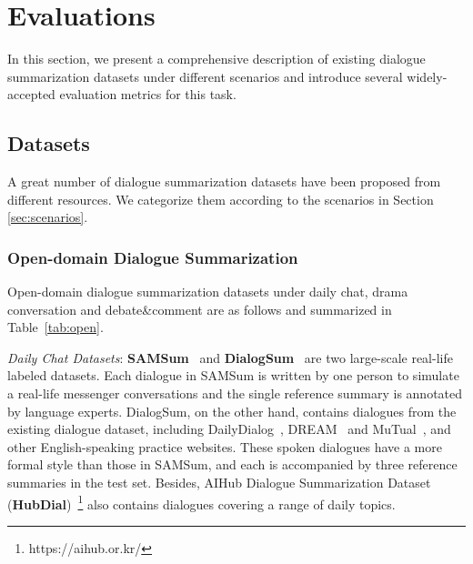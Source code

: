 \section{Evaluations}
\label{sec:evaluation}

In this section, we present a comprehensive description of existing dialogue summarization datasets 
under different scenarios and introduce several widely-accepted evaluation 
metrics for this task.

\subsection{Datasets}
\label{sec:dataset}

A great number of dialogue summarization datasets have been proposed from different resources. We categorize them according to the scenarios in Section \ref{sec:scenarios}. %


\subsubsection{Open-domain Dialogue Summarization}

Open-domain dialogue summarization datasets under daily chat, drama conversation and debate\&comment are as follows and summarized in Table~\ref{tab:open}.

\textit{Daily Chat Datasets}: \textbf{SAMSum}~\cite{gliwa2019samsum} and \textbf{DialogSum}~\cite{chen2021dialsumm} are two large-scale real-life labeled datasets. Each dialogue in SAMSum is written by one person to simulate a real-life 
messenger conversations and the single reference summary is annotated by 
language experts. DialogSum, on the other hand, contains dialogues from 
the existing dialogue dataset, including DailyDialog~\cite{li2017dailydialog}, 
DREAM~\cite{sun2019dream} and MuTual~\cite{cui2020mutual}, and other English-speaking practice websites. These spoken dialogues have a more formal style than those in SAMSum, and each is accompanied by three reference summaries in the test set.  %
Besides, AIHub Dialogue Summarization Dataset (\textbf{HubDial})~\footnote{https://aihub.or.kr/} also contains dialogues covering a range of daily topics.

